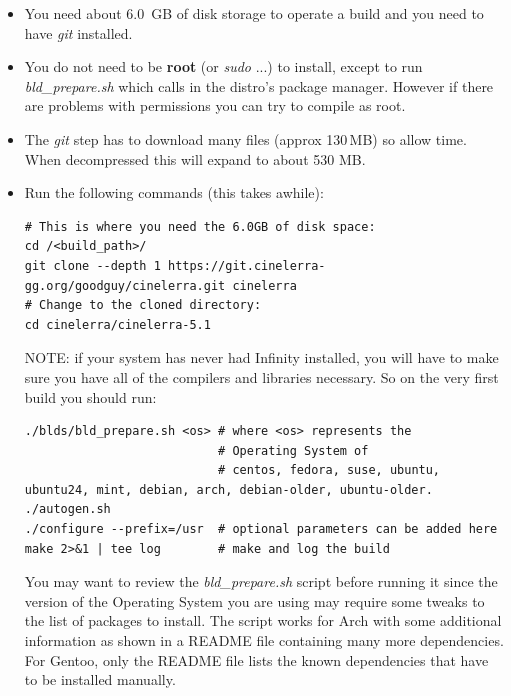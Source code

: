 \begin{itemize}
\item You need about 6.0 \,GB of disk storage to operate a build and
  you need to have \textit{git} installed.

\item You do not need to be \textbf{root} (or \textit{sudo} ...) to install, except to run \textit{bld\_prepare.sh} which calls in the distro's package manager. However if there are problems with permissions you can try to compile as root.

\item The \textit{git} step has to download many files (approx
  130\,MB) so allow time. When decompressed this will expand to
  about 530 MB.

\item Run the following commands (this takes awhile):

\begin{lstlisting}[style=sh]
# This is where you need the 6.0GB of disk space:
cd /<build_path>/
git clone --depth 1 https://git.cinelerra-gg.org/goodguy/cinelerra.git cinelerra
# Change to the cloned directory:
cd cinelerra/cinelerra-5.1
\end{lstlisting}
  NOTE: if your system has never had \CGG{} Infinity installed, you
  will have to make sure you have all of the compilers and libraries
  necessary.  So on the very first build you should run:

\begin{lstlisting}[style=sh]
./blds/bld_prepare.sh <os> # where <os> represents the
                           # Operating System of
                           # centos, fedora, suse, ubuntu, ubuntu24, mint, debian, arch, debian-older, ubuntu-older.
./autogen.sh
./configure --prefix=/usr  # optional parameters can be added here
make 2>&1 | tee log        # make and log the build
\end{lstlisting}

You may want to review the \textit{bld\_prepare.sh} script before running it since the version of the
Operating System you are using may require some tweaks to the list of packages to install.
The script works for Arch with some additional information as shown in a README file containing many more dependencies. For Gentoo, only the README file lists the known dependencies that have to be installed manually.


\end{itemize}
